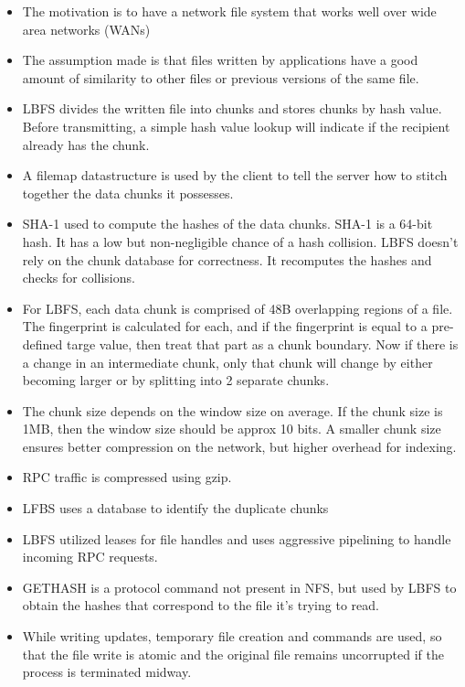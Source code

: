 \documentclass[a4paper]{article}
\begin{document}
\begin{itemize}
\item
    The motivation is to have a network file system that works well over
    wide area networks (WANs)
\item
    The assumption made is that files written by applications have a good
    amount of similarity to other files or previous versions of the same
    file.
\item
    LBFS divides the written file into chunks and stores chunks by hash
    value. Before transmitting, a simple hash value lookup will indicate
    if the recipient already has the chunk.
\item
    A filemap datastructure is used by the client to tell the server how
    to stitch together the data chunks it possesses.
\item
    SHA-1 used to compute the hashes of the data chunks. SHA-1 is a 64-bit
    hash. It has a low but non-negligible chance of a hash collision. LBFS
    doesn't rely on the chunk database for correctness. It recomputes the
    hashes and checks for collisions.
\item
    For LBFS, each data chunk is comprised of 48B overlapping regions of a
    file. The fingerprint is calculated for each, and if the fingerprint
    is equal to a pre-defined targe value, then treat that part as a chunk
    boundary. Now if there is a change in an intermediate chunk, only that
    chunk will change by either becoming larger or by splitting into 2
    separate chunks.
\item
    The chunk size depends on the window size on average. If the chunk
    size is 1MB, then the window size should be approx 10 bits. A smaller
    chunk size ensures better compression on the network, but higher
    overhead for indexing.
\item
    RPC traffic is compressed using gzip.
\item
    LFBS uses a database to identify the duplicate chunks
\item
    LBFS utilized leases for file handles and uses aggressive pipelining
    to handle incoming RPC requests.
\item
    GETHASH is a protocol command not present in NFS, but used by LBFS to
    obtain the hashes that correspond to the file it's trying to read.
\item
    While writing updates, temporary file creation and commands are used,
    so that the file write is atomic and the original file remains
    uncorrupted if the process is terminated midway.
\end{itemize}
\end{document}
